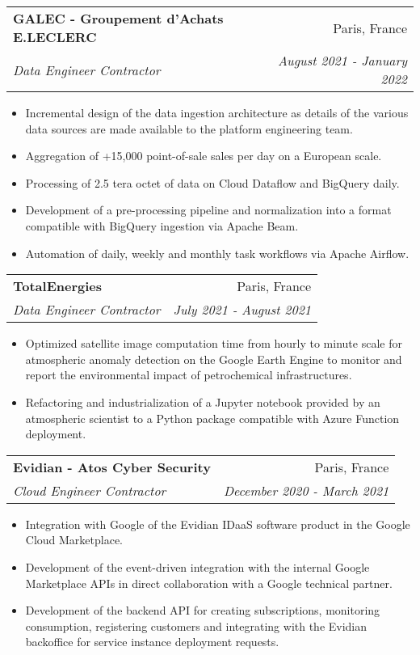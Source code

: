 \documentclass[letterpaper,11pt]{article}
\makeatletter
\newcommand{\resumeItem}[1]{
  \item\small{#1 \vspace{-2pt}}
}
\newcommand{\resumeSubheading}[4]{
  \vspace{-1pt}\item
    \begin{tabular*}{0.97\textwidth}[t]{l@{\extracolsep{\fill}}r}
      \textbf{#1} & #2 \\
      \textit{\small#3} & \textit{\small #4} \\
    \end{tabular*}\vspace{-5pt}
}
\newcommand{\resumeItemListStart}{\begin{itemize}}
\newcommand{\resumeItemListEnd}{\end{itemize}\vspace{-5pt}}
\makeatother
\begin{document}
\resumeSubheading{GALEC - Groupement d'Achats E.LECLERC}
{Paris, France}
{Data Engineer Contractor}
{August 2021 - January 2022}
\resumeItemListStart{}
\resumeItem{
  Incremental design of the data ingestion architecture as details of the various
  data sources are made available to the platform engineering team.
}
\resumeItem{
  Aggregation of +15,000 point-of-sale sales per day on a European scale.
}
\resumeItem{
  Processing of 2.5 tera octet of data on Cloud Dataflow and BigQuery daily.
}
\resumeItem{
  Development of a pre-processing pipeline and normalization into a format
  compatible with BigQuery ingestion via Apache Beam.
}
\resumeItem{
  Automation of daily, weekly and monthly task workflows via Apache Airflow.
}
\resumeItemListEnd{}

\resumeSubheading{TotalEnergies}
{Paris, France}
{Data Engineer Contractor}
{July 2021 - August 2021}
\resumeItemListStart{}
\resumeItem{
  Optimized satellite image computation time from hourly to minute scale for
  atmospheric anomaly detection on the Google Earth Engine to monitor and report
  the environmental impact of petrochemical infrastructures.
}
\resumeItem{
  Refactoring and industrialization of a Jupyter notebook provided by an
  atmospheric scientist to a Python package compatible with Azure Function
  deployment.
}
\resumeItemListEnd{}

\resumeSubheading{Evidian - Atos Cyber Security}
{Paris, France}
{Cloud Engineer Contractor}
{December 2020 - March 2021}
\resumeItemListStart{}
\resumeItem{
  Integration with Google of the Evidian IDaaS software product in the Google
  Cloud Marketplace.
}
\resumeItem{
  Development of the event-driven integration with the internal Google Marketplace
  APIs in direct collaboration with a Google technical partner.
}
\resumeItem{
  Development of the backend API for creating subscriptions, monitoring
  consumption, registering customers and integrating with the Evidian backoffice
  for service instance deployment requests.
}
\resumeItemListEnd{}
\end{document}
